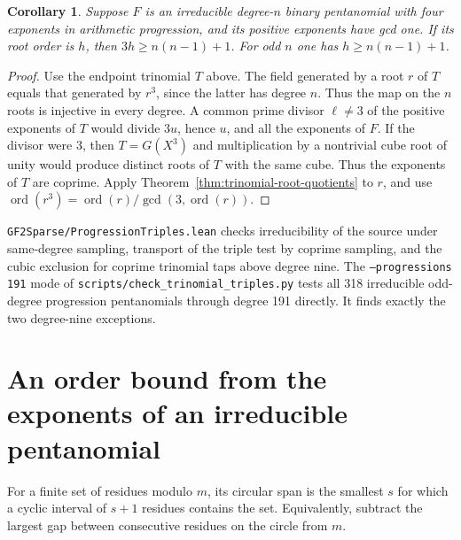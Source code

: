 \documentclass[11pt]{article}
\newtheorem{corollary}[theorem]{Corollary}
\newcommand{\ord}{\operatorname{ord}}
\begin{document}
\begin{corollary}\label{cor:progression-order}
Suppose \(F\) is an irreducible degree-\(n\) binary pentanomial with
four exponents in arithmetic progression, and its positive exponents
have gcd one. If its root order is \(h\), then
\(3h\ge n(n-1)+1\). For odd \(n\) one has \(h\ge n(n-1)+1\).
\end{corollary}
\begin{proof}
Use the endpoint trinomial \(T\) above. The field generated by a
root \(r\) of \(T\) equals that generated by \(r^3\), since the latter
has degree \(n\). Thus the map on the \(n\) roots is injective in
every degree. A common prime divisor \(\ell\ne3\) of the positive
exponents of \(T\) would divide \(3u\), hence \(u\), and all the
exponents of \(F\). If the divisor were 3, then \(T=G(X^3)\) and
multiplication by a nontrivial cube root of unity would produce distinct
roots of \(T\) with the same cube. Thus the exponents of \(T\) are
coprime. Apply Theorem~\ref{thm:trinomial-root-quotients} to \(r\),
and use \(\ord(r^3)=\ord(r)/\gcd(3,\ord(r))\).
\end{proof}

\nolinkurl{GF2Sparse/ProgressionTriples.lean} checks irreducibility of
the source under same-degree sampling, transport of the triple test by
coprime sampling, and the cubic exclusion for coprime trinomial taps
above degree nine. The \texttt{--progressions 191} mode of
\nolinkurl{scripts/check_trinomial_triples.py} tests all 318 irreducible
odd-degree progression pentanomials through degree 191 directly.
It finds exactly the two degree-nine exceptions.

\section{An order bound from the exponents of an irreducible pentanomial}
For a finite set of residues modulo \(m\), its circular span is the
smallest \(s\) for which a cyclic interval of \(s+1\) residues contains
the set. Equivalently, subtract the largest gap between consecutive
residues on the circle from \(m\).
\end{document}
